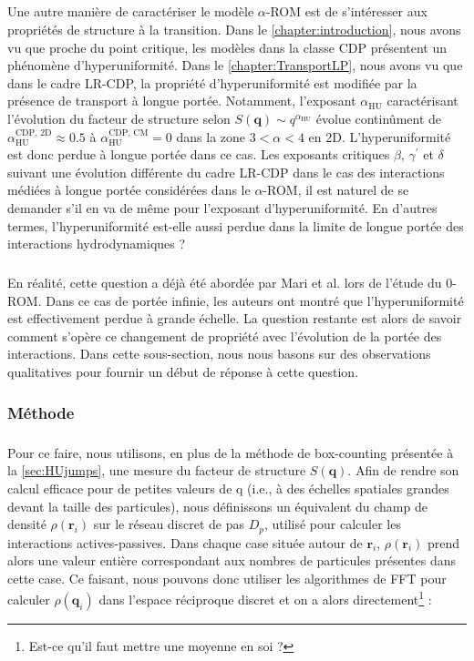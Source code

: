 \subparagraph{}Une autre manière de caractériser le modèle $\alpha$-ROM est de s'intéresser aux propriétés de structure à la transition. Dans le \autoref{chapter:introduction}, nous avons vu que proche du point critique, les modèles dans la classe CDP présentent un phénomène d'hyperuniformité. Dans le \autoref{chapter:TransportLP}, nous avons vu que dans le cadre LR-CDP, la propriété d'hyperuniformité est modifiée par la présence de transport à longue portée. Notamment, l'exposant $\alpha_\text{HU}$ caractérisant l'évolution du facteur de structure selon $S(\mathbf{q})\sim q^{\alpha_\text{HU}}$ évolue continûment de $\alpha_\text{HU}^\text{CDP, 2D}\approx 0.5$ à $\alpha_\text{HU}^\text{CDP, CM} = 0$ dans la zone $3<\alpha<4$ en 2D. L'hyperuniformité est donc perdue à longue portée dans ce cas. Les exposants critiques $\beta$, $\gamma^\prime$ et $\delta$ suivant une évolution différente du cadre LR-CDP dans le cas des interactions médiées à longue portée considérées dans le $\alpha$-ROM, il est naturel de se demander s'il en va de même pour l'exposant d'hyperuniformité. En d'autres termes, l'hyperuniformité est-elle aussi perdue dans la limite de longue portée des interactions hydrodynamiques ? 

\subparagraph{}En réalité, cette question a déjà été abordée par Mari et al. \cite{mari_absorbing_2022} lors de l'étude du 0-ROM. Dans ce cas de portée infinie, les auteurs ont montré que l'hyperuniformité est effectivement perdue à grande échelle. La question restante est alors de savoir comment s'opère ce changement de propriété avec l'évolution de la portée des interactions. Dans cette sous-section, nous nous basons sur des observations qualitatives pour fournir un début de réponse à cette question.

\subsubsection{Méthode}

\subparagraph{}Pour ce faire, nous utilisons, en plus de la méthode de box-counting présentée à la \autoref{sec:HUjumps}, une mesure du facteur de structure $S(\mathbf{q})$. Afin de rendre son calcul efficace pour de petites valeurs de q (i.e., à des échelles spatiales grandes devant la taille des particules), nous définissons un équivalent du champ de densité $\rho(\mathbf{r}_i)$ sur le réseau discret de pas $D_p$, utilisé pour calculer les interactions actives-passives. Dans chaque case située autour de $\mathbf{r}_i$, $\rho(\mathbf{r}_i)$ prend alors une valeur entière correspondant aux nombres de particules présentes dans cette case. Ce faisant, nous pouvons donc utiliser les algorithmes de FFT pour calculer $\hat{\rho}(\mathbf{q}_i)$ dans l'espace réciproque discret et on a alors directement\footnote{Est-ce qu'il faut mettre une moyenne en soi ?} :

